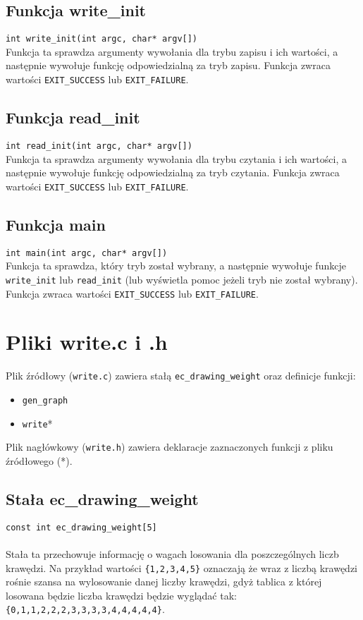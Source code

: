 \documentclass[11pt,a4paper]{report}
\begin{document}
    \subsection{Funkcja write\_init}
    \verb|int write_init(int argc, char* argv[])|\\
    Funkcja ta sprawdza argumenty wywołania dla trybu zapisu i ich wartości, a następnie wywołuje funkcję odpowiedzialną za tryb zapisu. Funkcja zwraca wartości \verb|EXIT_SUCCESS| lub \verb|EXIT_FAILURE|.\\
    \subsection{Funkcja read\_init}
    \verb|int read_init(int argc, char* argv[])|\\
    Funkcja ta sprawdza argumenty wywołania dla trybu czytania i ich wartości, a następnie wywołuje funkcję odpowiedzialną za tryb czytania. Funkcja zwraca wartości \verb|EXIT_SUCCESS| lub \verb|EXIT_FAILURE|.\\
    \subsection{Funkcja main}
    \verb|int main(int argc, char* argv[])|\\
    Funkcja ta sprawdza, który tryb został wybrany, a następnie wywołuje funkcje \verb|write_init| lub \verb|read_init| (lub wyświetla pomoc jeżeli tryb nie został wybrany). Funkcja zwraca wartości \verb|EXIT_SUCCESS| lub \verb|EXIT_FAILURE|.\\

    \newpage
    \section{Pliki write.c i .h}
    Plik źródłowy (\verb|write.c|) zawiera stałą \verb|ec_drawing_weight| oraz definicje funkcji:
    \begin{itemize}
        \item \verb|gen_graph|
        \item \verb|write|*
    \end{itemize}
    Plik nagłówkowy (\verb|write.h|) zawiera deklaracje zaznaczonych funkcji z pliku źródłowego (*).\\
    \subsection{Stała ec\_drawing\_weight}
    \verb|const int ec_drawing_weight[5]|\\
    \\
    Stała ta przechowuje informację o wagach losowania dla poszczególnych liczb krawędzi. Na przykład wartości \verb|{1,2,3,4,5}| oznaczają że wraz z liczbą krawędzi rośnie szansa na wylosowanie danej liczby krawędzi, gdyż tablica z której losowana będzie liczba krawędzi będzie wyglądać tak: \verb|{0,1,1,2,2,2,3,3,3,3,4,4,4,4,4}|.\\
\end{document}
